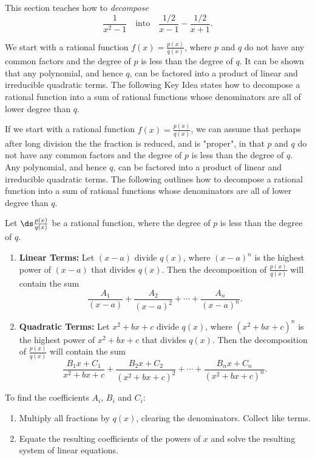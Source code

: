 This section teaches how to \textit{decompose} $$\frac{1}{x^2-1}\quad  \text{into}\quad  \frac{1/2}{x-1}-\frac{1/2}{x+1}.$$

We start with a rational function $f(x)=\frac{p(x)}{q(x)}$, where $p$ and $q$ do not have any common factors and the degree of $p$ is less than the degree of $q$. It can be shown that any polynomial, and hence $q$, can be factored into a product of linear and irreducible quadratic terms. The following Key Idea states how to decompose a rational function into a sum of rational functions whose denominators are all of lower degree than $q$.

If we start with a rational function $f(x)=\frac{p(x)}{q(x)}$, we can assume that perhaps after long division the the fraction is reduced, and is "proper", in that $p$ and $q$ do not have any common factors and the degree of $p$ is less than the degree of $q$. Any polynomial, and hence $q$, can be factored into a product of linear and irreducible quadratic terms. The following outlines how to decompose a rational function into a sum of rational functions whose denominators are all of lower degree than $q$.


\begin{formulabox} \label{idea:partial_fraction}
{Let $\ds \frac{p(x)}{q(x)}$ be a rational function, where the degree of $p$ is less than the degree of $q$.
\begin{enumerate}
	\item	\textbf{Linear Terms:} Let $(x-a)$ divide $q(x)$, where $(x-a)^n$ is the highest power of $(x-a)$ that divides $q(x)$. Then the decomposition of $\frac{p(x)}{q(x)}$ will contain the sum
	$$\frac{A_1}{(x-a)} + \frac{A_2}{(x-a)^2} + \cdots +\frac{A_n}{(x-a)^n}.$$
	\item		\textbf{Quadratic Terms:} Let $x^2+bx+c$ divide $q(x)$, where $(x^2+bx+c)^n$ is the highest power of $x^2+bx+c$ that divides $q(x)$. Then the decomposition of $\frac{p(x)}{q(x)}$ will contain the sum 
	$$\frac{B_1x+C_1}{x^2+bx+c}+\frac{B_2x+C_2}{(x^2+bx+c)^2}+\cdots+\frac{B_nx+C_n}{(x^2+bx+c)^n}.$$
	\end{enumerate}
	To find the coefficients $A_i$, $B_i$ and $C_i$:
	\begin{enumerate}
	\item	Multiply all fractions by $q(x)$, clearing the denominators. Collect like terms.
	\item		Equate the resulting coefficients of the powers of $x$ and solve the resulting system of linear equations.
	\end{enumerate}
}
\end{formulabox}

